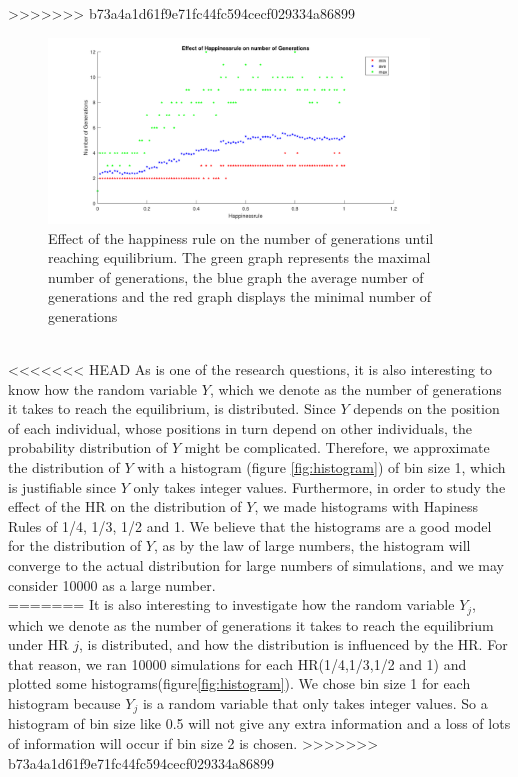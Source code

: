 >>>>>>> b73a4a1d61f9e71fc44fc594cecf029334a86899
\\
\begin{figure}[h!]
    \centering
    \includegraphics[width=0.9\textwidth]{happinessregel_aantgen_2.pdf}
    \caption{Effect of the happiness rule on the number of generations until reaching equilibrium. The green graph represents the maximal number of generations, the blue graph the average number of generations and the red graph displays the minimal number of generations}
    \label{fig:avegen}
\end{figure}
\\
<<<<<<< HEAD
As is one of the research questions, it is also interesting to know how the random variable $Y$, which we denote as the number of generations it takes to reach the equilibrium, is distributed. Since $Y$ depends on the position of each individual, whose positions in turn depend on other individuals, the probability distribution of $Y$ might be complicated. Therefore, we approximate the distribution of $Y$ with a histogram (figure \ref{fig:histogram}) of bin size 1, which is justifiable since $Y$ only takes integer values. Furthermore, in order to study the effect of the HR on the distribution of $Y$, we made histograms with Hapiness Rules of 1/4, 1/3, 1/2 and 1.  We believe that the histograms are a good model for the distribution of $Y$, as by the law of large numbers, the histogram will converge to the actual distribution for large numbers of simulations, and we may consider 10000 as a large number.\\
=======
It is also interesting to investigate how the random variable $Y_j$, which we denote as the number of generations it takes to reach the equilibrium under HR $j$, is distributed, and how the distribution is influenced by the HR. For that reason, we ran 10000 simulations for each HR(1/4,1/3,1/2 and 1) and plotted some histograms(figure\ref{fig:histogram}). We chose bin size 1 for each histogram because $Y_j$ is a random variable that only takes integer values. So a histogram of bin size like 0.5 will not give any extra information and a loss of lots of information will occur if bin size 2 is chosen. 
>>>>>>> b73a4a1d61f9e71fc44fc594cecf029334a86899
\\
 
